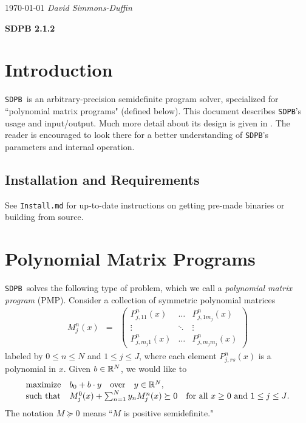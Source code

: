 \documentclass[12pt]{article}
\numberwithin{equation}{section}
\renewcommand{\be}{\begin{eqnarray}}
\renewcommand{\ee}{\end{eqnarray}}
\newcommand\SDPB{\texttt{SDPB}}
\begin{document}
\noindent \today
\hfill {\em David Simmons-Duffin}
{\Large
\begin{center}
{\bf SDPB 2.1.2 \\\vspace{.1in}}
\end{center}
}
\tableofcontents

\section{Introduction}

\SDPB\ is an arbitrary-precision semidefinite program solver, specialized for ``polynomial matrix programs" (defined below).  This document describes \SDPB's usage and input/output.  Much more detail about its design is given in \cite{DSD}. The reader is encouraged to look there for a better understanding of \SDPB's parameters and internal operation.

\subsection{Installation and Requirements}

See \texttt{Install.md} for up-to-date instructions on getting
pre-made binaries or building from source.

\section{Polynomial Matrix Programs}
\label{sec:PMP}

\SDPB\ solves the following type of problem, which we call a {\it polynomial matrix program} (PMP).  Consider a collection of symmetric polynomial matrices
\be
M_j^n(x) &=& \begin{pmatrix}
P_{j,11}^{n}(x) & \dots & P_{j,1m_j}^{n}(x)\\
\vdots & \ddots & \vdots\\
P_{j,m_j1}^{n}(x) & \dots & P^{n}_{j,m_jm_j}(x)
\end{pmatrix}
\ee
labeled by $0 \leq n \leq N$ and $1 \leq j \leq J$,
where each element $P_{j,rs}^{n}(x)$ is a polynomial in $x$.  
Given $b\in \mathbb{R}^N$, we would like to
\be
\label{eq:PMPconstraint}
\begin{array}{ll}
\textrm{maximize} & b_0+b\.y\quad\textrm{over}\quad y \in \R^N,\\
\textrm{such that} & M^0_j(x)+\sum_{n=1}^{N} y_n M^n_j(x) \succeq 0 \quad \textrm{for all $x\geq 0$ and $1 \leq j \leq J$}.
\end{array}
\ee
The notation $M\succeq 0$ means ``$M$ is positive semidefinite."
\end{document}
